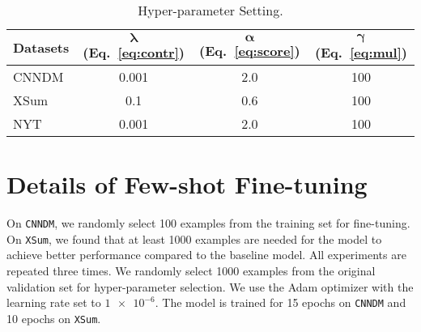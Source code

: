 \documentclass[11pt]{article}
\begin{document}
\begin{table}[t]
\centering
\begin{tabular}{lccc}
\toprule
\textbf{Datasets} &  $\mathbf{\lambda}$ (Eq.~\ref{eq:contr}) & $\mathbf{\alpha}$ (Eq.~\ref{eq:score})   &  $\mathbf{\gamma}$ (Eq.~\ref{eq:mul}) \\
\midrule
 CNNDM & 0.001 & 2.0 & 100 \\
 XSum & 0.1 & 0.6 & 100 \\
 NYT & 0.001 & 2.0 & 100  \\
\bottomrule
\end{tabular}
\caption{\label{tab:appendix} Hyper-parameter Setting.}
\end{table}

\section{Details of Few-shot Fine-tuning}
\label{appendix:few-shot}

On \texttt{CNNDM}, we randomly select 100 examples from the training set for fine-tuning.
On \texttt{XSum}, we found that at least 1000 examples are needed for the model to achieve better performance compared to the baseline model.
All experiments are repeated three times.
We randomly select 1000 examples from the original validation set for hyper-parameter selection.
We use the Adam optimizer with the learning rate set to $\num{1e-6}$.
The model is trained for 15 epochs on \texttt{CNNDM} and 10 epochs on \texttt{XSum}.
\end{document}

